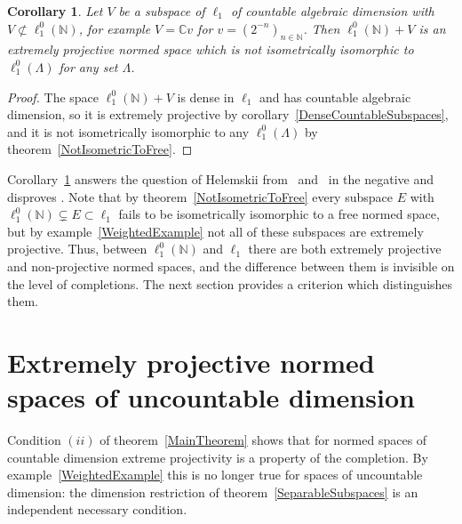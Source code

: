 \documentclass[12pt]{article}
\newtheorem{corollary}[theorem]{Corollary}
\newcommand{\lo}[1]{\ell_1^0(#1)}
\begin{document}
\begin{corollary}\label{CounterexampleCorollary} Let $V$ be a subspace of
    $\ell_1$ of countable algebraic dimension with $V\not\subset\lo{\mathbb{N}}$,
    for example $V=\mathbb{C}v$ for $v={(2^{-n})}_{n\in\mathbb{N}}$. Then
    $\lo{\mathbb{N}}+V$ is an extremely projective normed space which is not
    isometrically isomorphic to $\lo{\Lambda}$ for any set $\Lambda$.
\end{corollary}
\begin{proof} The space $\lo{\mathbb{N}}+V$ is dense in $\ell_1$ and has
    countable algebraic dimension, so it is extremely projective by
    corollary~\ref{DenseCountableSubspaces}, and it is not isometrically
    isomorphic to any $\lo{\Lambda}$ by theorem~\ref{NotIsometricToFree}.
\end{proof}

Corollary~\ref{CounterexampleCorollary} answers the question of Helemskii
from~\cite[section 2]{HelExtrProjSeqAlg} and~\cite[remark 3.6]{HelMetrFrQMod}
in the negative and disproves \cite[conjecture 3.1]{GronLiftProbNormSp}. Note
that by theorem~\ref{NotIsometricToFree} every subspace
$E$ with $\lo{\mathbb{N}}\subsetneq E\subset\ell_1$ fails to be isometrically
isomorphic to a free normed space, but by example~\ref{WeightedExample} not
all of these subspaces are extremely projective. Thus, between
$\lo{\mathbb{N}}$ and $\ell_1$ there are both extremely projective and
non-projective normed spaces, and the difference between them is invisible on
the level of completions. The next section provides a criterion which
distinguishes them.


\section{Extremely projective normed spaces of uncountable
  dimension}\label{SectionUncountable}

Condition $(ii)$ of theorem~\ref{MainTheorem} shows that for normed spaces of
countable dimension extreme projectivity is a property of the completion. By
example~\ref{WeightedExample} this is no longer true for spaces of uncountable
dimension: the dimension restriction of theorem~\ref{SeparableSubspaces} is an
independent necessary condition.
\end{document}
